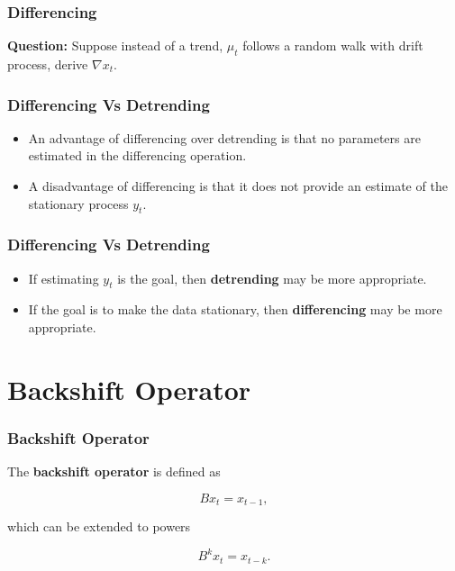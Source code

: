 \documentclass[%
xcolor=pdftex]{beamer}
\begin{document}
\begin{frame}
\frametitle{Differencing}

\textbf{Question:} Suppose instead of a trend, $\mu_t$ follows a random walk with drift process, derive $\nabla x_t$.

\vspace{50mm}

\end{frame}

\begin{frame}
\frametitle{Differencing Vs Detrending}

\begin{itemize}
\item An advantage of differencing over detrending is that no parameters are estimated in the differencing operation.
\item A disadvantage of differencing is that it does not provide an estimate of the stationary process $y_t$.
\end{itemize}

\end{frame}

\begin{frame}
\frametitle{Differencing Vs Detrending}

\begin{itemize}
\item If estimating $y_t$ is the goal, then \textbf{detrending} may be more appropriate.
\item If the goal is to make the data stationary, then \textbf{differencing} may be more appropriate.
\end{itemize}

\end{frame}

\section{Backshift Operator}
\frame{\tableofcontents[currentsection]}

\begin{frame}
\frametitle{Backshift Operator}

The \textbf{backshift operator} is defined as

\begin{equation*}
B x_t = x_{t-1},
\end{equation*}

which can be extended to powers

\begin{equation}
B^k x_t = x_{t-k}.
\end{equation}

\end{frame}
\end{document}
